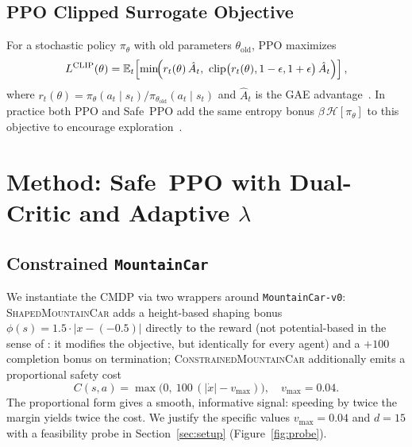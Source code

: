 \documentclass{article}
\newcommand{\figref}[1]{Figure~\ref{#1}}
\newcommand{\secref}[1]{Section~\ref{#1}}
\begin{document}
\subsection{PPO Clipped Surrogate Objective}
For a stochastic policy $\pi_\theta$ with old parameters $\theta_{\text{old}}$, PPO maximizes
\begin{equation}
\label{eq:ppo}
L^{\text{CLIP}}(\theta) = \mathbb{E}_t\!\left[
\min\!\Bigl( r_t(\theta)\,\hat{A}_t,\ \mathrm{clip}\bigl(r_t(\theta), 1-\epsilon, 1+\epsilon\bigr)\,\hat{A}_t \Bigr)
\right],
\end{equation}
where $r_t(\theta) = \pi_\theta(a_t\!\mid\!s_t) / \pi_{\theta_{\text{old}}}(a_t\!\mid\!s_t)$ and
$\hat{A}_t$ is the GAE advantage~\citep{schulman2016gae}. In practice both PPO and Safe~PPO add
the same entropy bonus $\beta\,\mathcal{H}[\pi_\theta]$ to this objective to encourage
exploration~\citep{mnih2016a3c}.


\section{Method: Safe~PPO with Dual-Critic and Adaptive $\lambda$}
\label{sec:method}

\subsection{Constrained \texttt{MountainCar}}
We instantiate the CMDP via two wrappers around \texttt{MountainCar-v0}:
\textsc{ShapedMountainCar} adds a height-based shaping bonus
$\phi(s) = 1.5 \cdot |x - (-0.5)|$ directly to the reward (not potential-based in the sense of
\citet{ng1999rewardshaping}: it modifies the objective, but identically for every agent) and a
$+100$ completion bonus on termination;
\textsc{ConstrainedMountainCar} additionally emits a proportional safety cost
\begin{equation}
\label{eq:cost}
C(s, a) = \max\!\bigl(0,\ 100\,(|\dot{x}| - v_{\max})\bigr), \quad v_{\max} = 0.04.
\end{equation}
The proportional form gives a smooth, informative signal: speeding by twice the margin yields
twice the cost. We justify the specific values $v_{\max}{=}0.04$ and $d{=}15$ with a feasibility probe in \secref{sec:setup} (\figref{fig:probe}).
\end{document}

